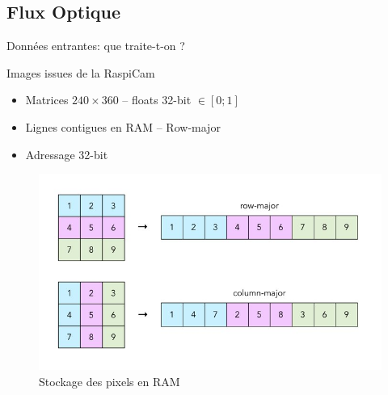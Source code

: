 \documentclass{bredelebeamer}
\begin{document}
	\subsection{Flux Optique}



\begin{frame}{Données entrantes: que traite-t-on ?}


\begin{block}{Images issues de la RaspiCam}
\begin{itemize}
\item Matrices $240\times 360$ -- floats 32-bit $\in \left[0;1\right]$
\item Lignes contigues en RAM -- Row-major
\item Adressage 32-bit
\end{itemize}
\end{block}

\begin{figure}
\centering
\includegraphics[scale=0.2]{images/rowcolumnarrays.jpg}
\caption{Stockage des pixels en RAM}
\end{figure}


\end{frame}

\end{document}
